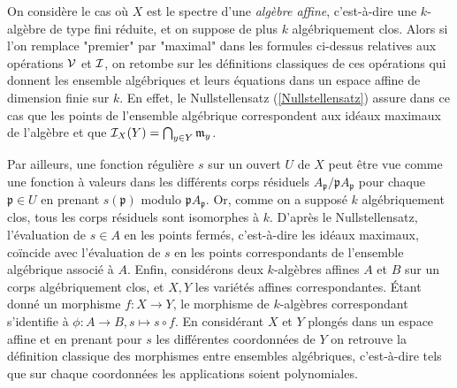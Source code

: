 \begin{rem}
On considère le cas où $X$ est le spectre d'une \textit{algèbre affine}, c'est-à-dire une $k$-algèbre de type fini réduite, et on suppose de plus $k$ algébriquement clos. Alors si l'on remplace "premier" par "maximal" dans les formules ci-dessus relatives aux opérations $\mathcal{V}$ et $\mathcal{I}$, on retombe sur les définitions classiques de ces opérations qui donnent les ensemble algébriques et leurs équations dans un espace affine de dimension finie sur $k$. En effet, le Nullstellensatz (\ref{Nullstellensatz}) assure dans ce cas que les points de l'ensemble algébrique correspondent aux idéaux maximaux de l'algèbre et que $\mathcal{I}_X(Y)=\bigcap_{y\in Y}\mathfrak{m}_y$.

Par ailleurs, une fonction régulière $s$ sur un ouvert $U$ de $X$ peut être vue comme une fonction à valeurs dans les différents corps résiduels $A_\mathfrak{p}/\mathfrak{p}A_\mathfrak{p}$ pour chaque $\mathfrak{p}\in U$ en prenant $s(\mathfrak{p})$ modulo $\mathfrak{p}A_\mathfrak{p}$. Or, comme on a supposé $k$ algébriquement clos, tous les corps résiduels sont isomorphes à $k$. D'après le Nullstellensatz, l'évaluation de $s\in A$ en les points fermés, c'est-à-dire les idéaux maximaux, coïncide avec l'évaluation de $s$ en les points correspondants de l'ensemble algébrique associé à $A$. Enfin, considérons deux $k$-algèbres affines $A$ et $B$ sur un corps algébriquement clos, et $X, Y$ les variétés affines correspondantes. Étant donné un morphisme $f:X\rightarrow Y$, le morphisme de $k$-algèbres correspondant s'identifie à $\phi:A\rightarrow B,s\mapsto s\circ f$. En considérant $X$ et $Y$ plongés dans un espace affine et en prenant pour $s$ les différentes coordonnées de $Y$ on retrouve la définition classique des morphismes entre ensembles algébriques, c'est-à-dire tels que sur chaque coordonnées les applications soient polynomiales.
\end{rem}

